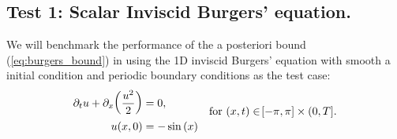 \documentclass[final]{amsart}
\numberwithin{equation}{section}
\begin{document}
\subsection{Test 1: Scalar Inviscid Burgers' equation. }
We will benchmark the performance of the a posteriori bound
(\ref{eq:burgers_bound}) in using the 1D inviscid Burgers' equation
with smooth a initial condition and periodic boundary conditions as
the test case:
\begin{equation}\label{eq_burgers}
\begin{aligned}
\partial_t u +\partial_x\!\left({\frac{u^2}{2}}\right)&=0,\\
u\!\left({x,0}\right)&=-\operatorname{sin}\left(x\right)
\end{aligned}\quad \text{for }\!\left({x,t}\right) \in \!\left[{-\pi,\pi}\right]\times(0,T].
\end{equation}
\end{document}
